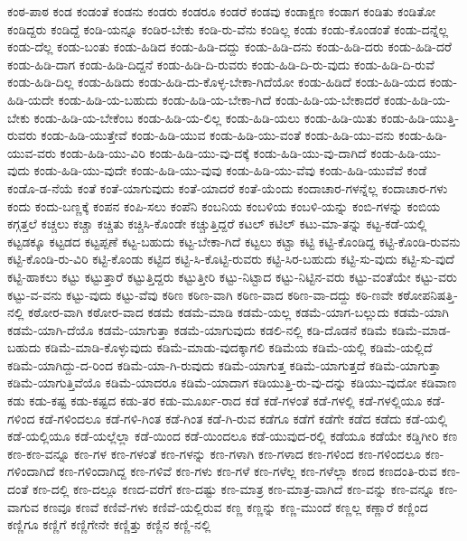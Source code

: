 {ಕಂಠ-ಪಾಠ
ಕಂಡ
ಕಂಡಂತೆ
ಕಂಡನು
ಕಂಡರು
ಕಂಡರೂ
ಕಂಡರೆ
ಕಂಡವು
ಕಂಡಾಕ್ಷಣ
ಕಂಡಾಗ
ಕಂಡಿತು
ಕಂಡಿತೋ
ಕಂಡಿದ್ದರು
ಕಂಡಿದ್ದೆ
ಕಂಡಿ-ಯನ್ನೂ
ಕಂಡಿರ-ಬೇಕು
ಕಂಡಿ-ರು-ವೆನು
ಕಂಡಿಲ್ಲ
ಕಂಡು
ಕಂಡು-ಕೊಂಡಂತೆ
ಕಂಡು-ದನ್ನೆಲ್ಲ
ಕಂಡು-ದೆಲ್ಲ
ಕಂಡು-ಬಂತು
ಕಂಡು-ಹಿಡಿದ
ಕಂಡು-ಹಿಡಿ-ದದ್ದು
ಕಂಡು-ಹಿಡಿ-ದನು
ಕಂಡು-ಹಿಡಿ-ದರು
ಕಂಡು-ಹಿಡಿ-ದರೆ
ಕಂಡು-ಹಿಡಿ-ದಾಗ
ಕಂಡು-ಹಿಡಿ-ದಿದ್ದನೆ
ಕಂಡು-ಹಿಡಿ-ದಿ-ರುವರು
ಕಂಡು-ಹಿಡಿ-ದಿ-ರು-ವುದು
ಕಂಡು-ಹಿಡಿ-ದಿ-ರುವೆ
ಕಂಡು-ಹಿಡಿ-ದಿಲ್ಲ
ಕಂಡು-ಹಿಡಿದು
ಕಂಡು-ಹಿಡಿ-ದು-ಕೊಳ್ಳ-ಬೇಕಾ-ಗಿದೆಯೋ
ಕಂಡು-ಹಿಡಿದೆ
ಕಂಡು-ಹಿಡಿ-ಯದ
ಕಂಡು-ಹಿಡಿ-ಯದೇ
ಕಂಡು-ಹಿಡಿ-ಯ-ಬಹುದು
ಕಂಡು-ಹಿಡಿ-ಯ-ಬೇಕಾ-ಗಿದೆ
ಕಂಡು-ಹಿಡಿ-ಯ-ಬೇಕಾದರೆ
ಕಂಡು-ಹಿಡಿ-ಯ-ಬೇಕು
ಕಂಡು-ಹಿಡಿ-ಯ-ಬೇಕೆಂಬ
ಕಂಡು-ಹಿಡಿ-ಯ-ಲಿಲ್ಲ
ಕಂಡು-ಹಿಡಿ-ಯಲು
ಕಂಡು-ಹಿಡಿ-ಯಿತು
ಕಂಡು-ಹಿಡಿ-ಯುತ್ತಿ-ರುವರು
ಕಂಡು-ಹಿಡಿ-ಯುತ್ತೇವೆ
ಕಂಡು-ಹಿಡಿ-ಯುವ
ಕಂಡು-ಹಿಡಿ-ಯು-ವಂತೆ
ಕಂಡು-ಹಿಡಿ-ಯು-ವನು
ಕಂಡು-ಹಿಡಿ-ಯುವ-ವರು
ಕಂಡು-ಹಿಡಿ-ಯು-ವಿರಿ
ಕಂಡು-ಹಿಡಿ-ಯು-ವು-ದಕ್ಕೆ
ಕಂಡು-ಹಿಡಿ-ಯು-ವು-ದಾಗಿದೆ
ಕಂಡು-ಹಿಡಿ-ಯು-ವುದು
ಕಂಡು-ಹಿಡಿ-ಯು-ವುದೇ
ಕಂಡು-ಹಿಡಿ-ಯು-ವುವು
ಕಂಡು-ಹಿಡಿ-ಯು-ವೆವು
ಕಂಡು-ಹಿಡಿ-ಯುವೆವೆ
ಕಂಡೆ
ಕಂಡೊ-ಡ-ನೆಯೆ
ಕಂತೆ
ಕಂತೆ-ಯಾಗುವುದು
ಕಂತೆ-ಯಾದರೆ
ಕಂತೆ-ಯೆಂದು
ಕಂದಾಚಾರ-ಗಳನ್ನೆಲ್ಲ
ಕಂದಾಚಾರ-ಗಳು
ಕಂದು
ಕಂದು-ಬಣ್ಣಕ್ಕೆ
ಕಂಪನ
ಕಂಪಿ-ಸಲು
ಕಂಪೆನಿ
ಕಂಬನಿಯ
ಕಂಬಳಿಯ
ಕಂಬಳಿ-ಯನ್ನು
ಕಂಬಿ-ಗಳನ್ನು
ಕಂಬಿಯ
ಕಗ್ಗತ್ತಲೆ
ಕಚ್ಚಲು
ಕಚ್ಚಾ
ಕಚ್ಚಿತು
ಕಚ್ಚಿಸಿ-ಕೊಂಡೇ
ಕಚ್ಚುತ್ತಿದ್ದರೆ
ಕಟಲ್
ಕಟಿಲ್
ಕಟು-ಮಾ-ತನ್ನು
ಕಟ್ಟ-ಕಡೆ-ಯಲ್ಲಿ
ಕಟ್ಟಡಕ್ಕೂ
ಕಟ್ಟಡದ
ಕಟ್ಟಪ್ಪಣೆ
ಕಟ್ಟ-ಬಹುದು
ಕಟ್ಟ-ಬೇಕಾ-ಗಿದೆ
ಕಟ್ಟಲು
ಕಟ್ಟಾ
ಕಟ್ಟಿ
ಕಟ್ಟಿ-ಕೊಂಡಿದ್ದ
ಕಟ್ಟಿ-ಕೊಂಡಿ-ರುವನು
ಕಟ್ಟಿ-ಕೊಂಡಿ-ರು-ವಿರಿ
ಕಟ್ಟಿ-ಕೊಂಡು
ಕಟ್ಟಿದ
ಕಟ್ಟಿ-ಸಿ-ಕೊಟ್ಟಿ-ರುವರು
ಕಟ್ಟಿ-ಸಿರ-ಬಹುದು
ಕಟ್ಟಿ-ಸು-ವುದು
ಕಟ್ಟಿ-ಸು-ವುದೆ
ಕಟ್ಟಿ-ಹಾಕಲು
ಕಟ್ಟು
ಕಟ್ಟುತ್ತಾರೆ
ಕಟ್ಟುತ್ತಿದ್ದರು
ಕಟ್ಟುತ್ತೀರಿ
ಕಟ್ಟು-ನಿಟ್ಟಾದ
ಕಟ್ಟು-ನಿಟ್ಟಿನ-ವರು
ಕಟ್ಟು-ವಂತೆಯೇ
ಕಟ್ಟು-ವರು
ಕಟ್ಟು-ವ-ವನು
ಕಟ್ಟು-ವುದು
ಕಟ್ಟು-ವೆವು
ಕಠಿಣ
ಕಠಿಣ-ವಾಗಿ
ಕಠಿಣ-ವಾದ
ಕಠಿಣ-ವಾ-ದದ್ದು
ಕಠಿ-ಣವೇ
ಕಠೋಪನಿಷತ್ತಿ-ನಲ್ಲಿ
ಕಠೋರ-ವಾಗಿ
ಕಠೋರ-ವಾದ
ಕಡಮೆ
ಕಡಮೆ-ಮಾಡಿ
ಕಡಮೆ-ಯಲ್ಲ
ಕಡಮೆ-ಯಾಗ-ಬಲ್ಲುದು
ಕಡಮೆ-ಯಾಗಿ
ಕಡಮೆ-ಯಾಗಿ-ದೆಯೊ
ಕಡಮೆ-ಯಾಗುತ್ತಾ
ಕಡಮೆ-ಯಾಗುವುದು
ಕಡಲಿ-ನಲ್ಲಿ
ಕಡಿ-ದೊಡನೆ
ಕಡಿಮೆ
ಕಡಿಮೆ-ಮಾಡ-ಬಹುದು
ಕಡಿಮೆ-ಮಾಡಿ-ಕೊಳ್ಳುವುದು
ಕಡಿಮೆ-ಮಾಡು-ವುದಕ್ಕಾಗಲಿ
ಕಡಿಮೆಯ
ಕಡಿಮೆ-ಯಲ್ಲಿ
ಕಡಿಮೆ-ಯಲ್ಲಿದೆ
ಕಡಿಮೆ-ಯಾಗಿದ್ದು-ದ-ರಿಂದ
ಕಡಿಮೆ-ಯಾ-ಗಿ-ರುವುದು
ಕಡಿಮೆ-ಯಾಗುತ್ತ
ಕಡಿಮೆ-ಯಾಗುತ್ತದೆ
ಕಡಿಮೆ-ಯಾಗುತ್ತಾ
ಕಡಿಮೆ-ಯಾಗುತ್ತಿವೆಯೊ
ಕಡಿಮೆ-ಯಾದರೂ
ಕಡಿಮೆ-ಯಾದಾಗ
ಕಡಿಯುತ್ತಿ-ರು-ವು-ದನ್ನು
ಕಡಿಯು-ವುದೋ
ಕಡಿವಾಣ
ಕಡು
ಕಡು-ಕಷ್ಟ
ಕಡು-ಕಷ್ಟದ
ಕಡು-ತರ
ಕಡು-ಮೂರ್ಖ-ರಾದ
ಕಡೆ
ಕಡೆ-ಗಳಂತೆ
ಕಡೆ-ಗಳಲ್ಲಿ
ಕಡೆ-ಗಳಲ್ಲಿಯೂ
ಕಡೆ-ಗಳಿಂದ
ಕಡೆ-ಗಳಿಂದಲೂ
ಕಡೆ-ಗಳಿ-ಗಿಂತ
ಕಡೆ-ಗಿಂತ
ಕಡೆ-ಗಿ-ರುವ
ಕಡೆಗೂ
ಕಡೆಗೆ
ಕಡೆಗೇ
ಕಡೆದ
ಕಡೆದು
ಕಡೆ-ಯಲ್ಲಿ
ಕಡೆ-ಯಲ್ಲಿಯೂ
ಕಡೆ-ಯಲ್ಲೆಲ್ಲಾ
ಕಡೆ-ಯಿಂದ
ಕಡೆ-ಯಿಂದಲೂ
ಕಡೆ-ಯುವುದ-ರಲ್ಲಿ
ಕಡೆಯೂ
ಕಡೆಯೇ
ಕಡ್ಡಿಗೀರಿ
ಕಣ
ಕಣ-ಕಣ-ವನ್ನೂ
ಕಣ-ಗಳ
ಕಣ-ಗಳಂತೆ
ಕಣ-ಗಳನ್ನು
ಕಣ-ಗಳಾಗಿ
ಕಣ-ಗಳಾದ
ಕಣ-ಗಳಿಂದ
ಕಣ-ಗಳಿಂದಲೂ
ಕಣ-ಗಳಿಂದಾಗಿದೆ
ಕಣ-ಗಳಿಂದಾಗಿದ್ದ
ಕಣ-ಗಳಿವೆ
ಕಣ-ಗಳು
ಕಣ-ಗಳೆ
ಕಣ-ಗಳೆಲ್ಲ
ಕಣ-ಗಳೆಲ್ಲಾ
ಕಣದ
ಕಣದಂತಿ-ರುವ
ಕಣ-ದಂತೆ
ಕಣ-ದಲ್ಲಿ
ಕಣ-ದಲ್ಲೂ
ಕಣದ-ವರೆಗೆ
ಕಣ-ದಷ್ಟು
ಕಣ-ಮಾತ್ರ
ಕಣ-ಮಾತ್ರ-ವಾಗಿದೆ
ಕಣ-ವನ್ನು
ಕಣ-ವನ್ನೂ
ಕಣ-ವಾಗುವ
ಕಣವೂ
ಕಣವೆ
ಕಣಿವೆ-ಗಳು
ಕಣಿವೆ-ಯಲ್ಲಿರುವ
ಕಣ್ಣ
ಕಣ್ಣನ್ನು
ಕಣ್ಣ-ಮುಂದೆ
ಕಣ್ಣಲ್ಲ
ಕಣ್ಣಾರೆ
ಕಣ್ಣಿಂದ
ಕಣ್ಣಿಗೂ
ಕಣ್ಣಿಗೆ
ಕಣ್ಣಿಗೇನೇ
ಕಣ್ಣಿತ್ತು
ಕಣ್ಣಿನ
ಕಣ್ಣಿ-ನಲ್ಲಿ
}
